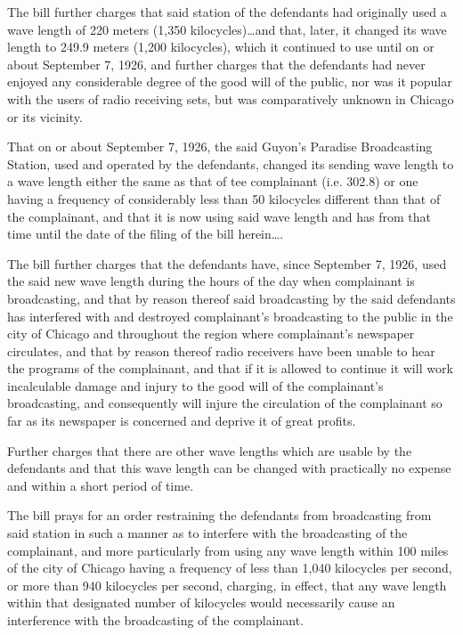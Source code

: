 The bill further charges that said station of the defendants had originally used
a wave length of 220 meters (1,350 kilocycles)\ldots and that, later, it
changed its wave length to 249.9 meters (1,200 kilocycles), which it continued
to use until on or about September 7, 1926, and further charges that the
defendants had never enjoyed any considerable degree of the good will of the
public, nor was it popular with the users of radio receiving sets, but was
comparatively unknown in Chicago or its vicinity.

That on or about September 7, 1926, the said Guyon's Paradise Broadcasting
Station, used and operated by the defendants, changed its sending wave length
to a wave length either the same as that of tee complainant (i.e. 302.8) or one
having a frequency of considerably less than 50 kilocycles different than that
of the complainant, and that it is now using said wave length and has from that
time until the date of the filing of the bill herein\ldots.

The bill further charges that the defendants have, since September 7, 1926, used
the said new wave length during the hours of the day when complainant is
broadcasting, and that by reason thereof said broadcasting by the said
defendants has interfered with and destroyed complainant's broadcasting to the
public in the city of Chicago and throughout the region where complainant's
newspaper circulates, and that by reason thereof radio receivers have been
unable to hear the programs of the complainant, and that if it is allowed to
continue it will work incalculable damage and injury to the good will of the
complainant's broadcasting, and consequently will injure the circulation of the
complainant so far as its newspaper is concerned and deprive it of great
profits.

Further charges that there are other wave lengths which are usable by the
defendants and that this wave length can be changed with practically no expense
and within a short period of time.

The bill prays for an order restraining the defendants from broadcasting from
said station in such a manner as to interfere with the broadcasting of the
complainant, and more particularly from using any wave length within 100 miles
of the city of Chicago having a frequency of less than 1,040 kilocycles per
second, or more than 940 kilocycles per second, charging, in effect, that any
wave length within that designated number of kilocycles would necessarily cause
an interference with the broadcasting of the complainant. 

